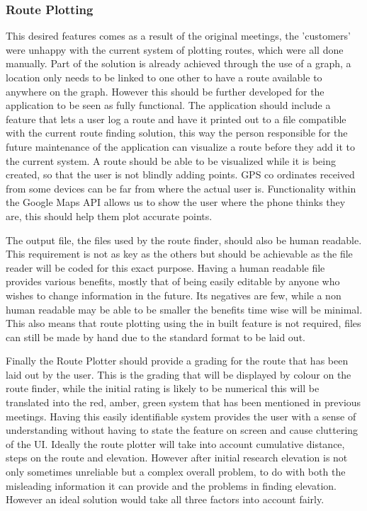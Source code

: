 \subsubsection{Route Plotting}
This desired features comes as a result of the original meetings, the 'customers' were unhappy with the current system of plotting routes, which were all done manually.  Part of the solution is already achieved through the use of a graph, a location only needs to be linked to one other to have a route available to anywhere on the graph. However this should be further developed for the application to be seen as fully functional. The application should include a feature that lets a user log a route and have it printed out to a file compatible with the current route finding solution, this way the person responsible for the future maintenance of the application can visualize a route before they add it to the current system. A route should be able to be visualized while it is being created, so that the user is not blindly adding points. GPS co ordinates received from some devices can be far from where the actual user is. Functionality within the Google Maps API\cite{maps} allows us to show the user where the phone thinks they are, this should help them plot accurate points. 

The output file, the files used by the route finder, should also be human readable. This requirement is not as key as the others but should be achievable as the file reader will be coded for this exact purpose. Having a human readable file provides various benefits, mostly that of being easily editable by anyone who wishes to change information in the future. Its negatives are few, while a non human readable may be able to be smaller the benefits time wise will be minimal. This also means that route plotting using the in built feature is not required, files can still be made by hand due to the standard format to be laid out. 

Finally the Route Plotter should provide a grading for the route that has been laid out by the user. This is the grading that will be displayed by colour on the route finder, while the initial rating is likely to be numerical this will be translated into the red, amber, green system that has been mentioned in previous meetings. Having this easily identifiable system provides the user with a sense of understanding without having to state the feature on screen and cause cluttering of the UI. Ideally the route plotter will take into account cumulative distance, steps on the route and elevation. However after initial research elevation is not only sometimes unreliable but a complex overall problem, to do with both the misleading information it can provide and the problems in finding elevation. However an ideal solution would take all three factors into account fairly.  
